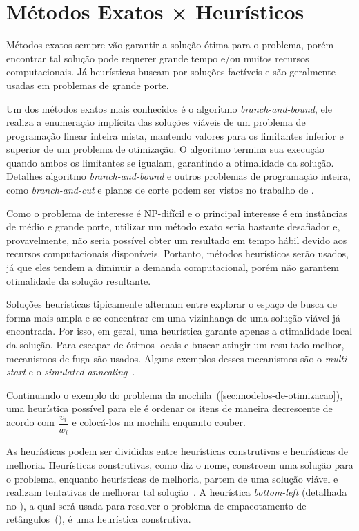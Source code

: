 \section{Métodos Exatos × Heurísticos}\label{sec:metodos-exatos-heuristicos}

Métodos exatos sempre vão garantir a solução ótima para o problema, porém encontrar
tal solução pode requerer grande tempo e/ou muitos recursos computacionais.
Já heurísticas buscam por soluções factíveis e são geralmente usadas em problemas de grande porte.

Um dos métodos exatos mais conhecidos é o algoritmo \textit{branch-and-bound}, ele realiza a
enumeração implícita das soluções viáveis de um problema de programação linear inteira mista,
mantendo valores para os limitantes inferior e superior de um problema de otimização.
O algoritmo termina sua execução quando ambos os limitantes se igualam, garantindo a otimalidade
da solução.
Detalhes algoritmo \textit{branch-and-bound} e outros problemas de programação inteira, como
\textit{branch-and-cut} e planos de corte podem ser vistos no trabalho de
\citeauthor*{wolsey2020integer}.

Como o problema de interesse é NP-difícil e o principal interesse é em instâncias de médio
e grande porte, utilizar um método exato seria bastante desafiador e, provavelmente, não seria
possível obter um resultado em tempo hábil devido aos recursos computacionais disponíveis.
Portanto, métodos heurísticos serão usados, já que eles tendem a diminuir a demanda computacional,
porém não garantem otimalidade da solução resultante.

Soluções heurísticas tipicamente alternam entre explorar o espaço de busca de forma mais ampla
e se concentrar em uma vizinhança de uma solução viável já encontrada.
Por isso, em geral, uma heurística garante apenas a otimalidade local da solução.
Para escapar de ótimos locais e buscar atingir um resultado melhor, mecanismos de fuga são usados.
Alguns exemplos desses mecanismos são o \textit{multi-start} e o \textit{simulated annealing}~\cite{
    firat2020effective,rakotonirainy2020improved,hopper2001empirical}.

Continuando o exemplo do problema da mochila~(\cref{sec:modelos-de-otimizacao}), uma heurística
possível para ele é ordenar os itens de maneira decrescente de acordo com $\dfrac{v_i}{w_i}$ e
colocá-los na mochila enquanto couber.

As heurísticas podem ser divididas entre heurísticas construtivas e heurísticas de melhoria.
Heurísticas construtivas, como diz o nome, constroem uma solução para o problema,
enquanto heurísticas de melhoria, partem de uma solução viável e realizam tentativas de
melhorar tal solução~\cite{michalewicz2013solve}.
A heurística \textit{bottom-left} (detalhada no ), a qual será usada para
resolver o problema de empacotamento de retângulos~(),
é uma heurística construtiva.